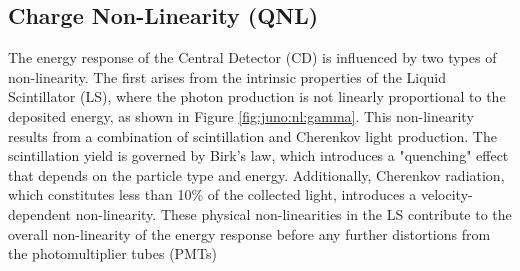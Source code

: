 \documentclass[../main.tex]{subfiles}
\begin{document}
%
%
%
%
%
%

\subsection{Charge Non-Linearity (QNL)}
\label{sec:joint_fit:qnl}

The energy response of the Central Detector (CD) is influenced by two types of non-linearity. The first arises from the intrinsic properties of the Liquid Scintillator (LS), where the photon production is not linearly proportional to the deposited energy, as shown in Figure \ref{fig:juno:nl:gamma}. This non-linearity results from a combination of scintillation and Cherenkov light production. The scintillation yield is governed by Birk's law, which introduces a "quenching" effect that depends on the particle type and energy. Additionally, Cherenkov radiation, which constitutes less than 10\% of the collected light, introduces a velocity-dependent non-linearity. These physical non-linearities in the LS contribute to the overall non-linearity of the energy response before any further distortions from the photomultiplier tubes (PMTs)
\end{document}
